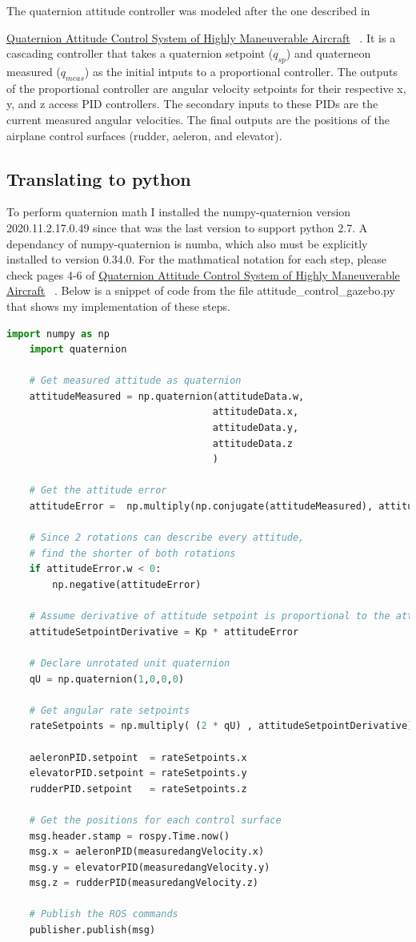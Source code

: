 \documentclass[11pt]{scrartcl} %
\begin{document}
The quaternion attitude controller was modeled after the one described in 

\underline{Quaternion Attitude Control System of Highly Maneuverable Aircraft} ~\cite{quat}. It is a cascading controller that takes a quaternion setpoint ($q_{sp}$) and quaterneon measured ($q_{meas}$) as the initial intputs to a proportional controller. The outputs of the proportional controller are angular velocity setpoints for their respective x, y, and z access PID controllers. The secondary inputs to these PIDs are the current measured angular velocities. The final outputs are the positions of the airplane control surfaces (rudder, aeleron, and elevator).

\subsection{Translating to python}
To perform quaternion math I installed the numpy-quaternion version 2020.11.2.17.0.49 since that was the last version to support python 2.7. 
A dependancy of numpy-quaternion is numba, which also must be explicitly installed to version 0.34.0.
For the mathmatical notation for each step, please check pages 4-6 of \underline{Quaternion Attitude Control System of Highly Maneuverable Aircraft} ~\cite{quat}. 
Below is a snippet of code from the file attitude\_control\_gazebo.py that shows my implementation of these steps.

\begin{lstlisting}[language=Python] 
    import numpy as np
    import quaternion

    # Get measured attitude as quaternion
    attitudeMeasured = np.quaternion(attitudeData.w,
                                    attitudeData.x,
                                    attitudeData.y,
                                    attitudeData.z
                                    ) 

    # Get the attitude error 
    attitudeError =  np.multiply(np.conjugate(attitudeMeasured), attitudeSetpoint)

    # Since 2 rotations can describe every attitude,
    # find the shorter of both rotations 
    if attitudeError.w < 0:
        np.negative(attitudeError)

    # Assume derivative of attitude setpoint is proportional to the attitude error
    attitudeSetpointDerivative = Kp * attitudeError

    # Declare unrotated unit quaternion
    qU = np.quaternion(1,0,0,0)  

    # Get angular rate setpoints 
    rateSetpoints = np.multiply( (2 * qU) , attitudeSetpointDerivative)

    aeleronPID.setpoint  = rateSetpoints.x
    elevatorPID.setpoint = rateSetpoints.y
    rudderPID.setpoint   = rateSetpoints.z

    # Get the positions for each control surface
    msg.header.stamp = rospy.Time.now()
    msg.x = aeleronPID(measuredangVelocity.x)
    msg.y = elevatorPID(measuredangVelocity.y) 
    msg.z = rudderPID(measuredangVelocity.z)

    # Publish the ROS commands
    publisher.publish(msg)
\end{lstlisting}
\end{document}
